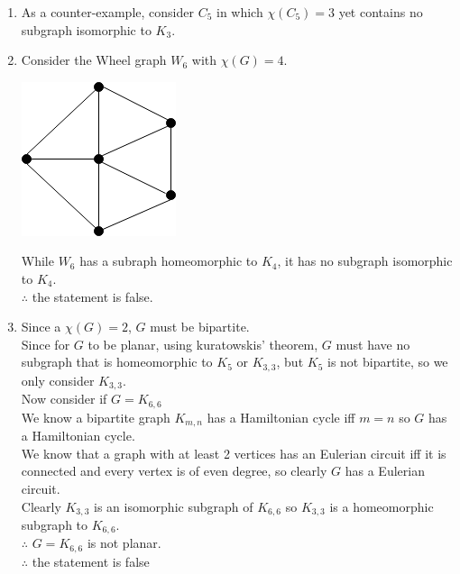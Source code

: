 \documentclass[11pt]{article}
\begin{document}
\begin{enumerate}[]
    \begin{enumerate}[label=\alph*)]
    \item
    	As a counter-example, consider $C_5$ in which $\chi(C_5) = 3$ yet contains no subgraph isomorphic to $K_3$.
    \item
    	Consider the Wheel graph $W_6$ with  $\chi(G)=4$.\\
    	\begin{center}
		\includegraphics[scale=0.5]{q6b-graph.png}\\
		\end{center}
		While $W_6$ has a subraph homeomorphic to $K_4$, it has no subgraph isomorphic to $K_4$.\\
		$\therefore$ the statement is false.
    	
    \item
    	Since a  $\chi(G)=2$, $G$ must be bipartite.\\
    	Since for $G$ to be planar, using kuratowskis' theorem, $G$ must have no subgraph that is homeomorphic to $K_5$ or $K_{3,3}$, but $K_5$ is not bipartite, so we only consider $K_{3,3}$.\\
    	Now consider if $G=K_{6,6}$\\
    	We know a bipartite graph $K_{m,n}$ has a Hamiltonian cycle iff $m=n$ so $G$ has a Hamiltonian cycle.\\
    	We know that a graph with at least 2 vertices has an Eulerian circuit iff it is connected and every vertex is of even degree, so clearly $G$ has a Eulerian circuit.\\
    	Clearly $K_{3,3}$ is an isomorphic subgraph of $K_{6,6}$ so $K_{3,3}$ is a homeomorphic subgraph to $K_{6,6}$.\\
    	$\therefore$ $G=K_{6,6}$ is not planar.\\
    	$\therefore$ the statement is false
    \end{enumerate}

\end{enumerate}
\end{document}

